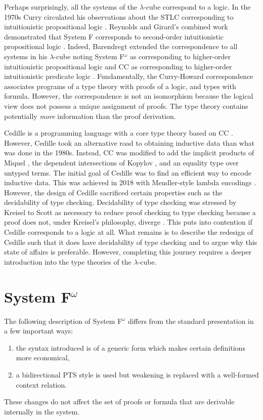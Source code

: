 Perhaps surprisingly, all the systems of the $\lambda$-cube correspond to a logic.
In the 1970s Curry circulated his observations about the STLC corresponding to intuitionistic propositional logic \cite{howard1980}.
Reynolds and Girard's combined work demonstrated that System F corresponds to second-order intuitionistic propositional logic \cite{girard1972,reynolds1974_systemf,reynolds1983}.
Indeed, Barendregt extended the correspondence to all systems in his $\lambda$-cube noting System F$^\omega$ as corresponding to higher-order intuitionistic propositional logic and CC as corresponding to higher-order intuitionistic predicate logic \cite{barendregt1991_pts}.
Fundamentally, the Curry-Howard correspondence associates programs of a type theory with proofs of a logic, and types with formula.
However, the correspondence is not an isomorphism because the logical view does not possess a unique assignment of proofs.
The type theory contains potentially \textit{more} information than the proof derivation.

Cedille is a programming language with a core type theory based on CC \cite{stump2017_cdle,stump2021_cedillecore}.
However, Cedille took an alternative road to obtaining inductive data than what was done in the 1980s.
Instead, CC was modified to add the implicit products of Miquel \cite{miquel2001}, the dependent intersections of Kopylov \cite{kopylov2003}, and an equality type over untyped terms.
The initial goal of Cedille was to find an efficient way to encode inductive data.
This was achieved in 2018 with Mendler-style lambda encodings \cite{firsov2018_mendler}. 
However, the design of Cedille sacrificed certain properties such as the decidability of type checking.
Decidability of type checking was stressed by Kreisel to Scott as necessary to reduce proof checking to type checking because a proof does not, under Kreisel's philosophy, diverge \cite{scott1970}.
This puts into contention if Cedille corresponds to a logic at all.
What remains is to describe the redesign of Cedille such that it does have decidability of type checking and to argue why this state of affairs is preferable.
However, completing this journey requires a deeper introduction into the type theories of the $\lambda$-cube.

\section{System \texorpdfstring{F$^\omega$}{F Omega}}

The following description of System F$^\omega$ differs from the standard presentation in a few important ways:
\begin{enumerate}
    \item the syntax introduced is of a generic form which makes certain definitions more economical,
    \item a bidirectional PTS style is used but weakening is replaced with a well-formed context relation.
\end{enumerate}
These changes do not affect the set of proofs or formula that are derivable internally in the system.

